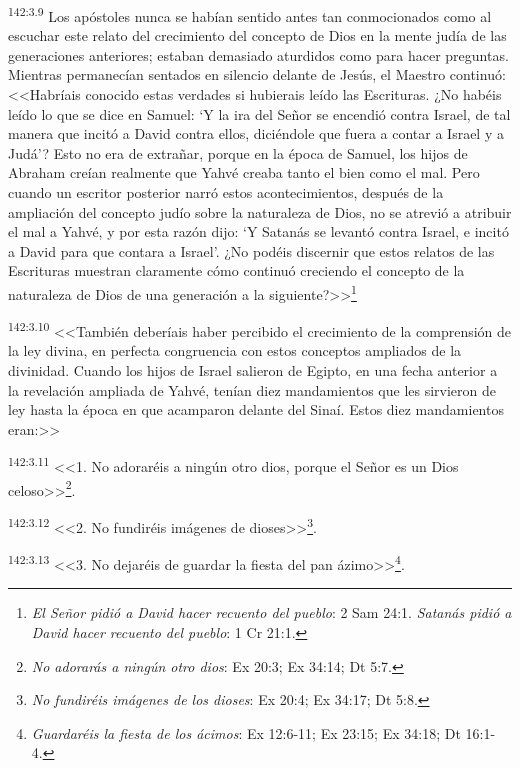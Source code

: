 \par 
\textsuperscript{142:3.9} Los apóstoles nunca se habían sentido antes tan conmocionados como al escuchar este relato del crecimiento del concepto de Dios en la mente judía de las generaciones anteriores; estaban demasiado aturdidos como para hacer preguntas. Mientras permanecían sentados en silencio delante de Jesús, el Maestro continuó: <<Habríais conocido estas verdades si hubierais leído las Escrituras. ¿No habéis leído lo que se dice en Samuel: `Y la ira del Señor se encendió contra Israel, de tal manera que incitó a David contra ellos, diciéndole que fuera a contar a Israel y a Judá'? Esto no era de extrañar, porque en la época de Samuel, los hijos de Abraham creían realmente que Yahvé creaba tanto el bien como el mal. Pero cuando un escritor posterior narró estos acontecimientos, después de la ampliación del concepto judío sobre la naturaleza de Dios, no se atrevió a atribuir el mal a Yahvé, y por esta razón dijo: `Y Satanás se levantó contra Israel, e incitó a David para que contara a Israel'. ¿No podéis discernir que estos relatos de las Escrituras muestran claramente cómo continuó creciendo el concepto de la naturaleza de Dios de una generación a la siguiente?>>\footnote{\textit{El Señor pidió a David hacer recuento del pueblo}: 2 Sam 24:1. \textit{Satanás pidió a David hacer recuento del pueblo}: 1 Cr 21:1.}

\par 
\textsuperscript{142:3.10} <<También deberíais haber percibido el crecimiento de la comprensión de la ley divina, en perfecta congruencia con estos conceptos ampliados de la divinidad. Cuando los hijos de Israel salieron de Egipto, en una fecha anterior a la revelación ampliada de Yahvé, tenían diez mandamientos que les sirvieron de ley hasta la época en que acamparon delante del Sinaí. Estos diez mandamientos eran:>>

\par 
\textsuperscript{142:3.11} <<1. No adoraréis a ningún otro dios, porque el Señor es un Dios celoso>>\footnote{\textit{No adorarás a ningún otro dios}: Ex 20:3; Ex 34:14; Dt 5:7.}.

\par 
\textsuperscript{142:3.12} <<2. No fundiréis imágenes de dioses>>\footnote{\textit{No fundiréis imágenes de los dioses}: Ex 20:4; Ex 34:17; Dt 5:8.}.

\par 
\textsuperscript{142:3.13} <<3. No dejaréis de guardar la fiesta del pan ázimo>>\footnote{\textit{Guardaréis la fiesta de los ácimos}: Ex 12:6-11; Ex 23:15; Ex 34:18; Dt 16:1-4.}.

